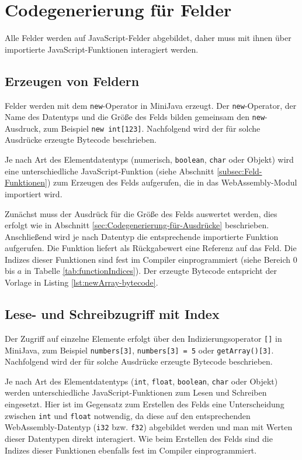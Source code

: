 \section{Codegenerierung für Felder}
Alle Felder werden auf JavaScript-Felder abgebildet, daher muss mit ihnen über importierte JavaScript-Funktionen interagiert werden.

\subsection{Erzeugen von Feldern}

Felder werden mit dem \lstinline{new}-Operator in MiniJava erzeugt. Der \lstinline{new}-Operator, der Name des Datentyps und die Größe des Felds bilden gemeinsam den \lstinline{new}-Ausdruck, zum Beispiel \lstinline{new int[123]}. Nachfolgend wird der für solche Ausdrücke erzeugte Bytecode beschrieben.

Je nach Art des Elementdatentyps (numerisch, \lstinline{boolean}, \lstinline{char} oder Objekt) wird eine unterschiedliche JavaScript-Funktion (siehe Abschnitt \ref{subsec:Feld-Funktionen}) zum Erzeugen des Felds aufgerufen, die in das WebAssembly-Modul importiert wird.

Zunächst muss der Ausdrück für die Größe des Felds auswertet werden, dies erfolgt wie in Abschnitt \ref{sec:Codegenerierung-für-Ausdrücke} beschrieben. Anschließend wird je nach Datentyp die entsprechende importierte Funktion aufgerufen. Die Funktion liefert als Rückgabewert eine Referenz auf das Feld. Die Indizes dieser Funktionen sind fest im Compiler einprogrammiert (siehe Bereich $0$ bis $a$ in Tabelle \ref{tab:functionIndices}). Der erzeugte Bytecode entspricht der Vorlage in Listing \ref{lst:newArray-bytecode}.



\subsection{Lese- und Schreibzugriff mit Index}

Der Zugriff auf einzelne Elemente erfolgt über den Indizierungsoperator \lstinline{[]} in MiniJava, zum Beispiel \lstinline{numbers[3]}, \lstinline{numbers[3] = 5} oder \lstinline{getArray()[3]}. Nachfolgend wird der für solche Ausdrücke erzeugte Bytecode beschrieben.

Je nach Art des Elementdatentyps (\lstinline{int}, \lstinline{float}, \lstinline{boolean}, \lstinline{char} oder Objekt) werden unterschiedliche JavaScript-Funktionen zum Lesen und Schreiben eingesetzt. Hier ist im Gegensatz zum Erstellen des Felds eine Unterscheidung zwischen \lstinline{int} und \lstinline{float} notwendig, da diese auf den entsprechenden WebAssembly-Datentyp (\lstinline{i32} bzw. \lstinline{f32}) abgebildet werden und man mit Werten dieser Datentypen direkt interagiert. Wie beim Erstellen des Felds sind die Indizes dieser Funktionen ebenfalls fest im Compiler einprogrammiert.

